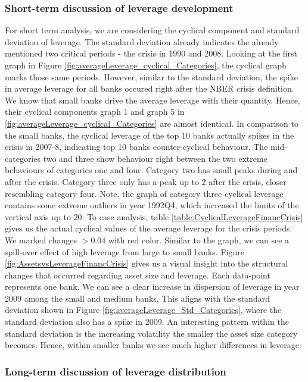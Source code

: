 \documentclass[12pt, a4paper]{article} %
\begin{document}
\subsubsection{Short-term discussion of leverage development}
For short term analysis, we are considering the cyclical component and standard deviation of leverage. The standard deviation already indicates the already mentioned two critical periods - the crisis in 1990 and 2008. Looking at the first graph in Figure \ref{fig:averageLeverage_cyclical_Categories}, the cyclical graph marks those same periods. However, similar to the standard deviation, the spike in average leverage for all banks occured right after the NBER crisis definition. We know that small banks drive the average leverage with their quantity. Hence, their cyclical components graph 1 and graph 5 in \ref{fig:averageLeverage_cyclical_Categories} are almost identical. In comparison to the small banks, the cyclical leverage of the top 10 banks actually spikes in the crisis in 2007-8, indicating top 10 banks counter-cyclical behaviour. The mid-categories two and three show behaviour right between the two extreme behaviours of categories one and four. Category two has small peaks during and after the crisis. Category three only has a peak up to $2$ after the crisis, closer resembling category four. Note, the graph of category three cyclical leverage contains some extreme outliers in year 1992Q4, which increased the limits of the vertical axis up to $20$.
To ease analysis, table \ref{table:CyclicalLeverageFinancCrisis} gives us the actual cyclical values of the average leverage for the crisis periods. We marked changes $>0.04$ with red color. Similar to the graph, we can see a spill-over effect of high leverage from large to small banks. Figure \ref{fig:AssetsvsLeverageFinancCrisis} gives us a visual insight into the structural changes that occurred regarding asset size and leverage. Each data-point represents one bank. We can see a clear increase in dispersion of leverage in year 2009 among the small and medium banks. This aligns with the standard deviation shown in Figure \ref{fig:averageLeverage_Std_Categories}, where the standard deviation also has a spike in 2009. An interesting pattern within the standard deviation is the increasing volatility the smaller the asset size category becomes. Hence, within smaller banks we see much higher differences in leverage. 

\subsubsection{Long-term discussion of leverage distribution}
\end{document}

